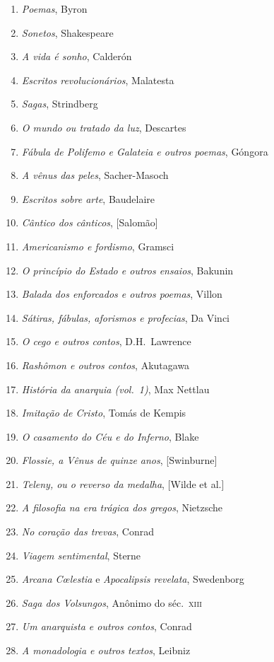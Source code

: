 \begin{enumerate}
\item \textit{Poemas}, Byron
\item \textit{Sonetos}, Shakespeare
\item \textit{A vida é sonho}, Calderón
\item \textit{Escritos revolucionários}, Malatesta
\item \textit{Sagas}, Strindberg
\item \textit{O mundo ou tratado da luz}, Descartes
\item \textit{Fábula de Polifemo e Galateia e outros poemas}, Góngora
\item \textit{A vênus das peles}, Sacher{}-Masoch
\item \textit{Escritos sobre arte}, Baudelaire
\item \textit{Cântico dos cânticos}, [Salomão]
\item \textit{Americanismo e fordismo}, Gramsci
\item \textit{O princípio do Estado e outros ensaios}, Bakunin
\item \textit{Balada dos enforcados e outros poemas}, Villon
\item \textit{Sátiras, fábulas, aforismos e profecias}, Da Vinci
\item \textit{O cego e outros contos}, D.H.~Lawrence
\item \textit{Rashômon e outros contos}, Akutagawa
\item \textit{História da anarquia (vol.~1)}, Max Nettlau
\item \textit{Imitação de Cristo}, Tomás de Kempis
\item \textit{O casamento do Céu e do Inferno}, Blake
\item \textit{Flossie, a Vênus de quinze anos}, [Swinburne]
\item \textit{Teleny, ou o reverso da medalha}, [Wilde et al.]
\item \textit{A filosofia na era trágica dos gregos}, Nietzsche
\item \textit{No coração das trevas}, Conrad
\item \textit{Viagem sentimental}, Sterne
\item \textit{Arcana C\oe lestia} e \textit{Apocalipsis revelata}, Swedenborg
\item \textit{Saga dos Volsungos}, Anônimo do séc.~\textsc{xiii}
\item \textit{Um anarquista e outros contos}, Conrad
\item \textit{A monadologia e outros textos}, Leibniz

\end{enumerate}
